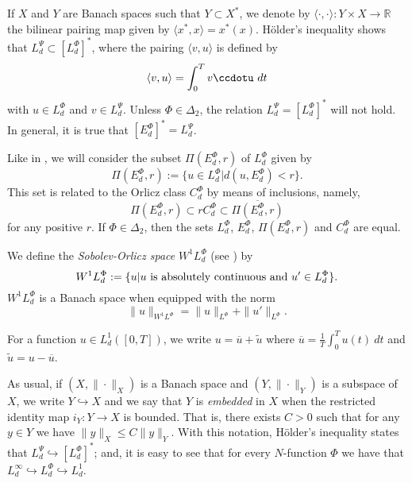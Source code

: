 \documentclass[twoside]{article}
\theoremstyle{remark}
\newcommand{\orlnor}{\|_{L^{\Phi}}}
\newcommand{\lphi}{L^{\Phi}}
\newcommand{\lpsi}{L^{\Psi}}
\newcommand{\ephi}{E^{\Phi}}
\newcommand{\claseor}{C^{\Phi}}
\newcommand{\wphi}{W^{1}\lphi}
\renewcommand{\leq}{\leqslant}
\begin{document}
If $X$ and $Y$ are  Banach spaces such that  $Y\subset X^*$, we denote by $\langle\cdot,\cdot\rangle:Y\times X\to\mathbb{R}$ the bilinear pairing  map given by $\langle x^*,x\rangle=x^*(x)$. H\"older's inequality shows that $\lpsi_d\subset \left[\lphi_d\right]^*$, where the pairing  
$\langle v, u\rangle$
is defined by 
\begin{equation}\label{pairing}
  \langle v,u\rangle=\int_0^Tv\ccdotu\ dt
\end{equation}
with  $u\in\lphi_d$ and $v\in\lpsi_d$.
 Unless $\Phi \in \Delta_2$, the relation $\lpsi_d= \left[\lphi_d\right]^*$ will not hold. In general, it is true  that  $\left[\ephi_d\right]^*=\lpsi_d$.


Like in \cite{KR}, we will consider the subset $\Pi(\ephi_d,r)$ of $\lphi_d$ given by
\[\Pi(\ephi_d,r):=\{u\in\lphi_d| d(u,\ephi_d)<r\}.\]
This set is related to the Orlicz class $\claseor_d$ by means of inclusions, namely,
\begin{equation}\label{inclusiones}\Pi(\ephi_d, r )\subset r \claseor_d\subset\overline{\Pi(\ephi_d,r)}
\end{equation}
for any positive $r$.
If $\Phi \in \Delta_2$,  then the sets $\lphi_d$, $\ephi_d$, $\Pi(\ephi_d,r)$ and $\claseor_d$ are equal.



We define the \emph{Sobolev-Orlicz space} $\wphi_d$ (see \cite{adams_sobolev}) by
\[\wphi_d:=\{u| u \hbox{ is absolutely continuous and } u'\in \lphi_d\}.\]
$\wphi_d$ is a Banach space when equipped with the norm
\begin{equation}\label{def-norma-orlicz-sob}
\|  u  \|_{\wphi}= \|  u  \|_{\lphi} + \|u'\orlnor.
\end{equation}



For a  function $u\in L^1_d([0,T])$, we write $u=\overline{u}+\widetilde{u}$ where $\overline{u} =\frac1T\int_0^T u(t)\ dt$ and $\widetilde{u}=u-\overline{u}$.

As usual, if $(X,\|\cdot\|_X)$ is a Banach space and $(Y,\|\cdot \|_Y)$ is a subspace of $X$,  we write $Y\hookrightarrow X$ and we say that $Y$ is \emph{embedded} in $X$  when the restricted identity map $i_Y:Y\to X$ is bounded. That is, there exists $C>0$ such that  for any $y\in Y$ we have $\|y\|_X\leq C\|y\|_Y$.  With this notation, H\"older's inequality states that  $\lpsi_d\hookrightarrow  \left[\lphi_d\right]^*$; and, it is easy to see that for every $N$-function $\Phi$ we have that $L^{\infty}_d\hookrightarrow\lphi_d \hookrightarrow L^1_d$.
\end{document}
